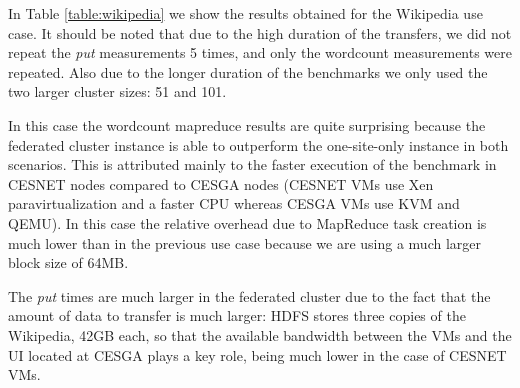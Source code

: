 In Table \ref{table:wikipedia} we show the results obtained for the Wikipedia use case. It should be noted that due to the high duration of the transfers, we did not repeat the \emph{put} measurements 5 times, and only the wordcount measurements were repeated. Also due to the longer duration of the benchmarks we only used the two larger cluster sizes: 51 and 101.

In this case the wordcount mapreduce results are quite surprising because the federated cluster instance is able to outperform the one-site-only instance in both scenarios. This is attributed mainly to the faster execution of the benchmark in CESNET nodes compared to CESGA nodes (CESNET VMs use Xen paravirtualization and a faster CPU whereas CESGA VMs use KVM and QEMU). In this case the relative overhead due to MapReduce task creation is much lower than in the previous use case because we are using a much larger block size of 64MB.

The \emph{put} times are much larger in the federated cluster due to the fact that the amount of data to transfer is much larger: HDFS stores three copies of the Wikipedia, 42GB each, so that the available bandwidth between the VMs and the UI located at CESGA plays a key role, being much lower in the case of CESNET VMs.

